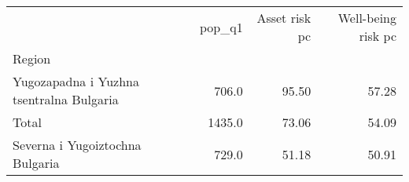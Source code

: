 \begin{tabular}{lrrr}
\toprule
{} &  pop\_q1 &  Asset risk pc &  Well-being risk pc \\
Region                                   &         &                &                     \\
\midrule
Yugozapadna i Yuzhna tsentralna Bulgaria &   706.0 &          95.50 &               57.28 \\
Total                                    &  1435.0 &          73.06 &               54.09 \\
Severna i Yugoiztochna Bulgaria          &   729.0 &          51.18 &               50.91 \\
\bottomrule
\end{tabular}
